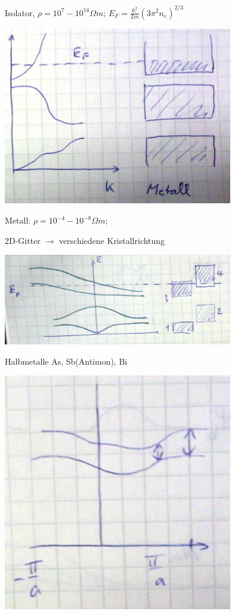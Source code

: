 Isolator, \(\rho = 10^7-10^{14}\Omega m\); \(E_F = \frac{\hbar^2}{2m}(3\pi^2 n_e)^{2/3}\)

\includegraphics[width=0.75\textwidth]{kap06_44.png}

Metall: \(\rho = 10^{-4}-10^{-8}\Omega m\); 


2D-Gitter \(\rightarrow \) verschiedene Kristallrichtung


\includegraphics[width=0.75\textwidth]{kap06_45.png}


Halbmetalle As, Sb(Antimon), Bi 

\includegraphics[width=0.75\textwidth]{kap06_46.png}


